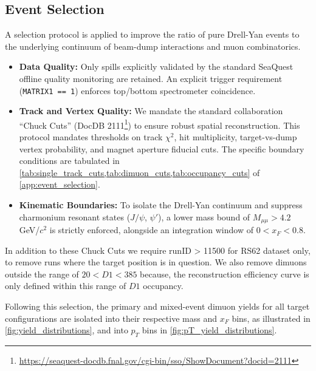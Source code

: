 \documentclass[11pt]{article}
\begin{document}
\subsection{Event Selection}
\label{sec:event_selection}
A selection protocol is applied to improve the ratio of pure Drell-Yan events to the underlying continuum of beam-dump interactions and muon combinatorics.
\begin{itemize}
    \item \textbf{Data Quality:} Only spills explicitly validated by the standard SeaQuest offline quality monitoring are retained. An explicit trigger requirement (\texttt{MATRIX1 == 1}) enforces top/bottom spectrometer coincidence.
    \item \textbf{Track and Vertex Quality:} We mandate the standard collaboration ``Chuck Cuts'' (DocDB 2111\footnote{\url{https://seaquest-docdb.fnal.gov/cgi-bin/sso/ShowDocument?docid=2111}}) to ensure robust spatial reconstruction. This protocol mandates thresholds on track $\chi^2$, hit multiplicity, target-vs-dump vertex probability, and magnet aperture fiducial cuts. The specific boundary conditions are tabulated in \cref{tab:single_track_cuts,tab:dimuon_cuts,tab:occupancy_cuts} of \cref{app:event_selection}.
    \item \textbf{Kinematic Boundaries:} To isolate the Drell-Yan continuum and suppress charmonium resonant states ($J/\psi$, $\psi'$), a lower mass bound of $M_{\mu\mu} > 4.2$ GeV/$c^2$ is strictly enforced, alongside an integration window of $0 < x_F < 0.8$.
\end{itemize}
In addition to these Chuck Cuts we require runID > 11500 for RS62 dataset only, to remove runs where the target position is in question.
We also remove dimuons outside the range of $20 < D1 < 385$ because, the reconstruction efficiency curve is only defined within this range of $D1$ occupancy.

Following this selection, the primary and mixed-event dimuon yields for all target configurations are isolated into their respective mass and $x_F$ bins, as illustrated in \cref{fig:yield_distributions},
and into $p_T$ bins in \cref{fig:pT_yield_distributions}.
\end{document}
